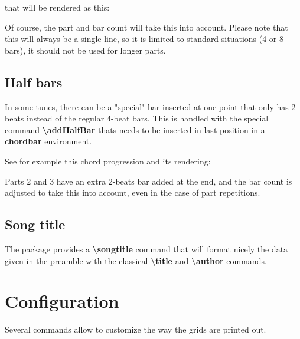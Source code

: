\documentclass[11pt]{article}
\newcommand{\btt}{\bfseries \ttfamily }
\newcommand{\tbs}{\textbackslash{}}
\begin{document}
that will be rendered as this:


Of course, the part and bar count will take this into account.
Please note that this will always be a single line, so it is limited to standard situations (4 or 8 bars), it should not be used for longer parts.

\subsection{Half bars}

In some tunes, there can be a "special" bar inserted at one point that only has 2 beats instead of the regular 4-beat bars.
This is handled with the special command {\btt \tbs addHalfBar} thats needs to be inserted in last position in a {\btt chordbar} environment.

See for example this chord progression and its rendering:



\resetchordbars
\countbarsYes


Parts 2 and 3 have an extra 2-beats bar added at the end, and the bar count is adjusted to take this into account, even in the case of part repetitions.

\subsection{Song title}

The package provides a {\btt \tbs songtitle} command that will format nicely the data given in the preamble with the classical 
{\btt \tbs title} and {\btt \tbs author} commands.


\section{Configuration}
\label{sec:config}

Several commands allow to customize the way the grids are printed out.
\end{document}
